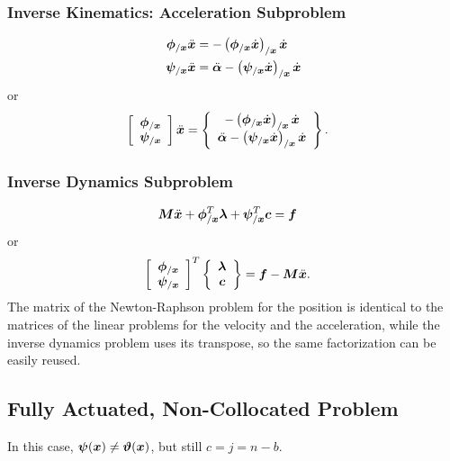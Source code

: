 \subsubsection{Inverse Kinematics: Acceleration Subproblem}
\begin{subequations}
\begin{align}
	\bm{\phi}_{/\bm{x}} \ddot{\bm{x}}
	&=
	-\left( \bm{\phi}_{/\bm{x}} \dot{\bm{x}} \right)_{/\bm{x}} \dot{\bm{x}}
	\\
	\bm{\psi}_{/\bm{x}} \ddot{\bm{x}}
	&=
	\ddot{\bm{\alpha}}
	-
	\left( \bm{\psi}_{/\bm{x}} \dot{\bm{x}} \right)_{/\bm{x}} \dot{\bm{x}}
\end{align}
\end{subequations}
or
\begin{align}
	\left[ \begin{array}{c} 
		\bm{\phi}_{/\bm{x}}
		\\
		\bm{\psi}_{/\bm{x}}
	 \end{array} \right] \ddot{\bm{x}}
	&=
	\left\{ \begin{array}{c} 
		-\left( \bm{\phi}_{/\bm{x}} \dot{\bm{x}} \right)_{/\bm{x}} \dot{\bm{x}}
		\\
		\ddot{\bm{\alpha}}
		-
		\left( \bm{\psi}_{/\bm{x}} \dot{\bm{x}} \right)_{/\bm{x}} \dot{\bm{x}}
	 \end{array} \right\}
	.
\end{align}

\subsubsection{Inverse Dynamics Subproblem}
\begin{align}
	\bm{M} \ddot{\bm{x}}
	+
	\bm{\phi}_{/\bm{x}}^T \bm{\lambda}
	+
	\bm{\psi}_{/\bm{x}}^T \bm{c}
	&=
	\bm{f}
	\label{eq:id:facp:ids}
\end{align}
or
\begin{align}
	\left[ \begin{array}{c} 
		\bm{\phi}_{/\bm{x}}
		\\
		\bm{\psi}_{/\bm{x}}
	 \end{array} \right]^T \left\{ \begin{array}{c} 
		\bm{\lambda}
		\\
		\bm{c}
	 \end{array} \right\}
	&=
	\bm{f}
	-
	\bm{M} \ddot{\bm{x}}
	\label{eq:id:facp}
	.
\end{align}
The matrix of the Newton-Raphson problem for the position
is identical to the matrices of the linear problems for the velocity
and the acceleration, while the inverse dynamics problem uses its transpose,
so the same factorization can be easily reused.



\subsection{Fully Actuated, Non-Collocated Problem}
\label{sec:id:fancp}
In this case, $\bm{\psi}(\bm{x}) \neq \bm{\vartheta}(\bm{x})$,
but still $c = j = n - b$.

